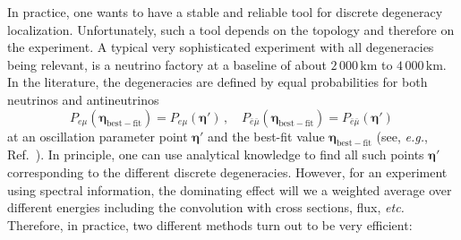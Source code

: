 \documentclass[12pt,a4paper]{article}
\begin{document}
In practice, one wants to have a stable and reliable tool for discrete degeneracy localization.
Unfortunately, such a tool depends on the topology and therefore on the experiment.
A typical very sophisticated experiment with all degeneracies being relevant, is a neutrino factory at a baseline of about $2 \, 000 \, \mathrm{km}$ to $4 \, 000 \, \mathrm{km}$. In the literature, the degeneracies
are defined by equal probabilities for both neutrinos and antineutrinos
\begin{equation}
P_{e \mu} (\boldsymbol{\eta_\mathrm{best-fit}}) = P_{e \mu} (\boldsymbol{\eta'}) \, , \quad  P_{\bar{e} \bar{\mu}}(\boldsymbol{\eta_\mathrm{best-fit}}) = P_{\bar{e} \bar{\mu}}(\boldsymbol{\eta'})\, 
\end{equation}
at an oscillation parameter point $\boldsymbol{\eta'}$ and the best-fit value $\boldsymbol{\eta_{\mathrm{best-fit}}}$ (see, {\em e.g.}, Ref.~\cite{Barger:2001yr}).
In principle, one can use analytical knowledge to find all such points $\boldsymbol{\eta'}$ corresponding to the different discrete degeneracies. However, for an experiment using spectral information, the dominating effect will we a weighted average over different energies including the convolution with cross sections, flux, {\em etc.} Therefore, in practice, two different methods turn out to be very efficient:  
\end{document}
